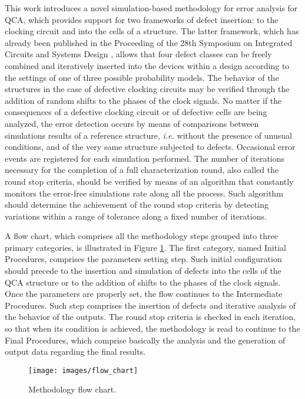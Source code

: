 This work introduces a novel simulation-based methodology for error analysis for QCA, which provides support for two frameworks of defect insertion: to the clocking circuit and into the cells of a structure. The latter framework, which has already been published in the Proceeding of the 28th Symposium on Integrated Circuits and Systems Design \cite{reis15_sbcci}, allows that four defect classes can be freely combined and iteratively inserted into the devices within a design according to the settings of one of three possible probability models. The behavior of the structures in the case of defective clocking circuits may be verified through the addition of random shifts to the phases of the clock signals. No matter if the consequences of a defective clocking circuit or of defective cells are being analyzed, the error detection occurs by means of comparisons between simulations results of a reference structure, \textit{i.e.} without the presence of unusual conditions, and of the very same structure subjected to defects. Occasional error events are registered for each simulation performed. The number of iterations necessary for the completion of a full characterization round, also called the round stop criteria, should be verified by means of an algorithm that constantly monitors the error-free simulations rate along all the process. Such algorithm should determine the achievement of the round stop criteria by detecting variations within a range of tolerance along a fixed number of iterations.

A flow chart, which comprises all the methodology steps grouped into three primary categories, is illustrated in Figure \ref{figure:flow_chart}. The first category, named Initial Procedures, comprises the parameters setting step. Such initial configuration should precede to the insertion and simulation of defects into the cells of the QCA structure or to the addition of shifts to the phases of the clock signals. Once the parameters are properly set, the flow continues to the Intermediate Procedures. Such step comprises the insertion of defects and iterative analysis of the behavior of the outputs. The round  stop criteria is checked in each iteration, so that when its condition is achieved, the methodology is read to continue to the Final Procedures, which comprise basically the analysis and the generation of output data regarding the final results.

\begin{figure}[!ht]
\center
\texttt{[image: images/flow\_chart]}
\caption{Methodology flow chart.}
\label{figure:flow_chart}
\end{figure}

